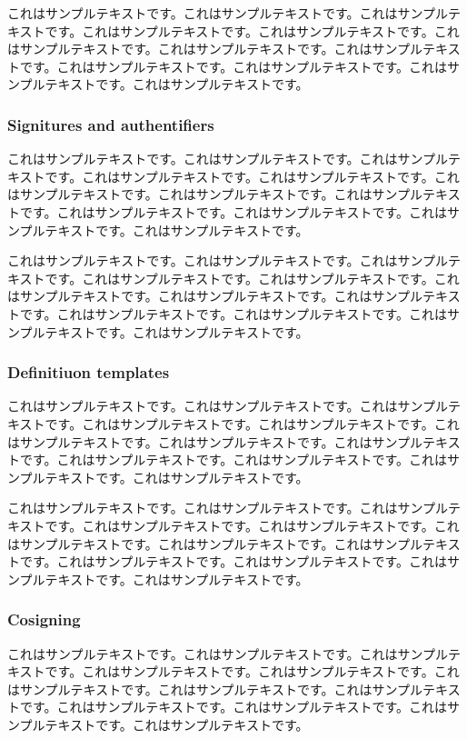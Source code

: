 \documentclass[a4paper, dvipdfmx]{jsarticle}
\begin{document}
これはサンプルテキストです。これはサンプルテキストです。これはサンプルテキストです。これはサンプルテキストです。これはサンプルテキストです。これはサンプルテキストです。これはサンプルテキストです。これはサンプルテキストです。これはサンプルテキストです。これはサンプルテキストです。これはサンプルテキストです。これはサンプルテキストです。

\subsubsection{Signitures and authentifiers}
これはサンプルテキストです。これはサンプルテキストです。これはサンプルテキストです。これはサンプルテキストです。これはサンプルテキストです。これはサンプルテキストです。これはサンプルテキストです。これはサンプルテキストです。これはサンプルテキストです。これはサンプルテキストです。これはサンプルテキストです。これはサンプルテキストです。

これはサンプルテキストです。これはサンプルテキストです。これはサンプルテキストです。これはサンプルテキストです。これはサンプルテキストです。これはサンプルテキストです。これはサンプルテキストです。これはサンプルテキストです。これはサンプルテキストです。これはサンプルテキストです。これはサンプルテキストです。これはサンプルテキストです。

\subsubsection{Definitiuon templates}
これはサンプルテキストです。これはサンプルテキストです。これはサンプルテキストです。これはサンプルテキストです。これはサンプルテキストです。これはサンプルテキストです。これはサンプルテキストです。これはサンプルテキストです。これはサンプルテキストです。これはサンプルテキストです。これはサンプルテキストです。これはサンプルテキストです。

これはサンプルテキストです。これはサンプルテキストです。これはサンプルテキストです。これはサンプルテキストです。これはサンプルテキストです。これはサンプルテキストです。これはサンプルテキストです。これはサンプルテキストです。これはサンプルテキストです。これはサンプルテキストです。これはサンプルテキストです。これはサンプルテキストです。

\subsubsection{Cosigning}
これはサンプルテキストです。これはサンプルテキストです。これはサンプルテキストです。これはサンプルテキストです。これはサンプルテキストです。これはサンプルテキストです。これはサンプルテキストです。これはサンプルテキストです。これはサンプルテキストです。これはサンプルテキストです。これはサンプルテキストです。これはサンプルテキストです。
\end{document}
